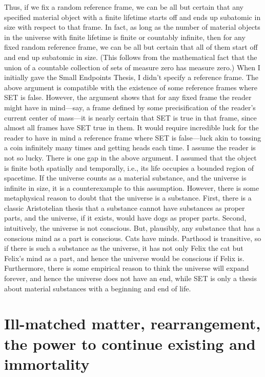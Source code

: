 Thus, if we fix a random reference frame, we can be all but certain that any specified material object with a finite lifetime 
starts off and ends up subatomic in size with respect to that frame. In fact, as long as the number of material objects in 
the universe with finite lifetime is finite or countably infinite, then for any fixed random reference frame, we can be all 
but certain that all of them start off and end up subatomic in size. (This follows from the mathematical fact that the 
union of a countable collection of sets of measure zero has measure zero.) When I initially gave the Small Endpoints Thesis, 
I didn’t specify a reference frame. The above argument is compatible with the existence of some reference frames where SET is false. However, the argument shows that for any fixed frame the reader might have in mind—say, a frame defined by some precisification of the reader’s current center of mass—it is nearly certain that SET is true in that frame, since almost all frames have SET true in them. It would require incredible luck for the reader to have in mind a reference frame where SET is false—luck akin to tossing a coin infinitely many times and getting heads each time. I assume the reader is not so lucky.
	There is one gap in the above argument. I assumed that the object is finite both spatially and temporally, i.e., its life occupies a bounded region of spacetime. If the universe counts as a material substance, and the universe is infinite in size, it is a counterexample to this assumption. However, there is some metaphysical reason to doubt that the universe is a substance. First, there is a classic Aristotelian thesis that a substance cannot have substances as proper parts, and the universe, if it exists, would have dogs as proper parts. Second, intuitively, the universe is not conscious. But, plausibly, any substance that has a conscious mind as a part is conscious. Cats have minds. Parthood is transitive, so if there is such a substance as the universe, it has not only Felix the cat but Felix’s mind as a part, and hence the universe would be conscious if Felix is. Furthermore, there is some empirical reason to think the universe will expand forever, and hence the universe does not have an end, while SET is only a thesis about material substances with a beginning and end of life.


\section{Ill-matched matter, rearrangement, the power to continue existing and immortality}


